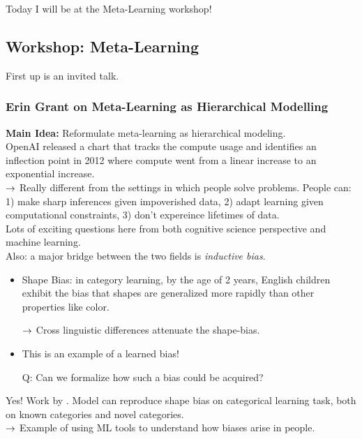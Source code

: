 Today I will be at the Meta-Learning workshop!

\subsection{Workshop: Meta-Learning}

First up is an invited talk.

\subsubsection{Erin Grant on Meta-Learning as Hierarchical Modelling}

{\bf Main Idea:} Reformulate meta-learning as hierarchical modeling. \\

OpenAI released a chart that tracks the compute usage and identifies an inflection point in 2012 where compute went from a linear increase to an exponential increase. \\

$\rightarrow$ Really different from the settings in which people solve problems. People can: 1) make sharp inferences given impoverished data, 2) adapt learning given computational constraints, 3) don't expereince lifetimes of data. \\

Lots of exciting questions here from both cognitive science perspective and machine learning. \\

Also: a major bridge between the two fields is {\it inductive bias}.
\begin{itemize}
    \item Shape Bias: in category learning, by the age of 2 years, English children exhibit the bias that shapes are generalized more rapidly than other properties like color.
    
    $\rightarrow$ Cross linguistic differences attenuate the shape-bias.
    
    \item This is an example of a learned bias!
    
    Q: Can we formalize how such a bias could be acquired?
\end{itemize}

Yes! Work by \citet{kemp2007learning}. Model can reproduce shape bias on categorical learning task, both on known categories and novel categories.\\

$\rightarrow$ Example of using ML tools to understand how biases arise in people. \\

